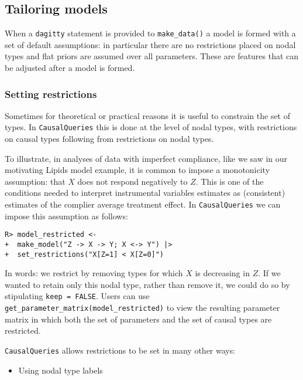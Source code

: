 \documentclass[
  11pt,
  article]{jss}
\providecommand{\tightlist}{%
  \setlength{\itemsep}{0pt}\setlength{\parskip}{0pt}}\usepackage{longtable,booktabs,array}
\begin{document}
\hypertarget{tailoring-models}{%
\subsection{Tailoring models}\label{tailoring-models}}

When a \texttt{dagitty} statement is provided to \texttt{make\_data()} a
model is formed with a set of default assumptions: in particular there
are no restrictions placed on nodal types and flat priors are assumed
over all parameters. These are features that can be adjusted after a
model is formed.

\hypertarget{restrictions}{%
\subsubsection{Setting restrictions}\label{restrictions}}

Sometimes for theoretical or practical reasons it is useful to constrain
the set of types. In \texttt{CausalQueries} this is done at the level of
nodal types, with restrictions on causal types following from
restrictions on nodal types.

To illustrate, in analyses of data with imperfect compliance, like we
saw in our motivating Lipids model example, it is common to impose a
monotonicity assumption: that \(X\) does not respond negatively to
\(Z\). This is one of the conditions needed to interpret instrumental
variables estimates as (consistent) estimates of the complier average
treatment effect. In \texttt{CausalQueries} we can impose this
assumption as follows:

\begin{verbatim}
R> model_restricted <- 
+  make_model("Z -> X -> Y; X <-> Y") |> 
+  set_restrictions("X[Z=1] < X[Z=0]")
\end{verbatim}

In words: we restrict by removing types for which \(X\) is decreasing in
\(Z\). If we wanted to retain only this nodal type, rather than remove
it, we could do so by stipulating \texttt{keep\ =\ FALSE}. Users can use
\texttt{get\_parameter\_matrix(model\_restricted)} to view the resulting
parameter matrix in which both the set of parameters and the set of
causal types are restricted.

\texttt{CausalQueries} allows restrictions to be set in many other ways:

\begin{itemize}
\tightlist
\item
  Using nodal type labels
\end{itemize}
\end{document}
